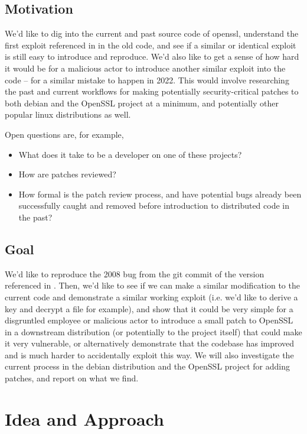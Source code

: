 \documentclass[conference]{IEEEtran}
\begin{document}
\subsection{Motivation}
We'd like to dig into the current and past source code of openssl,
understand the first exploit referenced in \cite{1} in the old code,
and see if a similar or identical exploit is still easy to introduce
and reproduce. We'd also like to get a sense of how hard it would be
for a malicious actor to introduce another similar exploit into the
code -- for a similar mistake to happen in 2022. This would involve
researching the past and current workflows for making potentially
security-critical patches to both debian and the OpenSSL project at a
minimum, and potentially other popular linux distributions as well.

Open questions are, for example,

\begin{itemize}
\item What does it take to be a developer on one of these projects?
\item How are patches reviewed?
\item How formal is the patch review process, and have potential bugs
  already been successfully caught and removed before introduction to
  distributed code in the past?
\end{itemize}

\subsection{Goal}
We'd like to reproduce the 2008 bug from the git commit of the version
referenced in \cite{2}. Then, we'd like to see if we can make a
similar modification to the current code and demonstrate a similar
working exploit (i.e. we'd like to derive a key and decrypt a file for
example), and show that it could be very simple for a disgruntled
employee or malicious actor to introduce a small patch to OpenSSL in a
downstream distribution (or potentially to the project itself) that
could make it very vulnerable, or alternatively demonstrate that the
codebase has improved and is much harder to accidentally exploit this
way. We will also investigate the current process in the debian
distribution and the OpenSSL project for adding patches, and report on
what we find.

\section{Idea and Approach}
\end{document}

